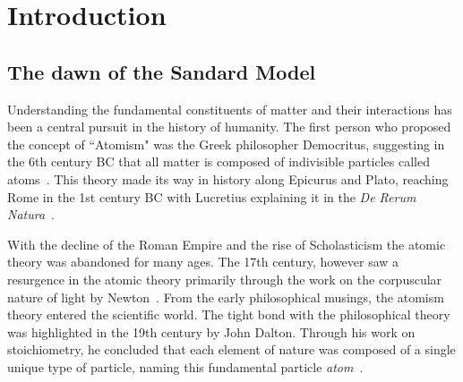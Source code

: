\renewcommand{\chaptermark}[1]{\markboth{#1}{}}
\renewcommand{\sectionmark}[1]{\markright{#1}}
\fancyhead{} %
\fancyhead[LE]{\chaptername~\thechapter | \leftmark}
\fancyhead[RO]{\thesection~\rightmark}
\fancyfoot{} %
\fancyfoot[LE,RO]{\thepage}

    
\chapter{Introduction}
\label{chp:intro}
\section{The dawn of the Sandard Model}
Understanding the fundamental constituents of matter and their interactions has been a central pursuit in the history of humanity. The first person who proposed the concept of ``Atomism" was the Greek philosopher Democritus, suggesting in the 6th century BC that all matter is composed of indivisible particles called atoms~\cite{laertius1853lives}.
This theory made its way in history along Epicurus and Plato, reaching Rome in the 1st century BC with Lucretius explaining it in the \textit{De Rerum Natura}~\cite{LucretiusCarus+2019}. 

With the decline of the Roman Empire and the rise of Scholasticism the atomic theory was abandoned for many ages. The 17th century, however saw a resurgence in the atomic theory primarily through the work on the corpuscular nature of light by Newton~\cite{Newton1704-NEWO}. From the early philosophical musings, the atomism theory entered the scientific world. The tight bond with the philosophical theory was highlighted in the 19th century by John Dalton. Through his work on stoichiometry, he concluded that each element of nature was composed of a single unique type of particle, naming this fundamental particle \textit{atom}~\cite{Dalton}. 

